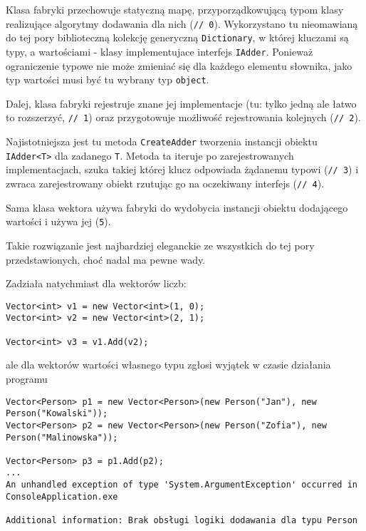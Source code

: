 Klasa fabryki przechowuje statyczną mapę, przyporządkowującą typom klasy realizujące algorytmy dodawania
dla nich ({\tt // 0}). Wykorzystano tu nieomawianą do tej pory biblioteczną kolekcję generyczną {\tt Dictionary},
w której kluczami są typy, a wartościami - klasy implementujace interfejs {\tt IAdder}. Ponieważ ograniczenie typowe
nie może zmieniać się dla każdego elementu słownika, jako typ wartości musi być tu wybrany typ {\tt object}.

Dalej, klasa fabryki rejestruje znane jej implementacje (tu: tylko jedną ale łatwo to rozszerzyć, {\tt // 1}) oraz
przygotowuje możliwość rejestrowania kolejnych ({\tt // 2}). 

Najistotniejsza jest tu metoda {\tt CreateAdder} tworzenia instancji obiektu {\tt IAdder<T>} dla zadanego {\tt T}.
Metoda ta iteruje po zarejestrowanych implementacjach, szuka takiej której klucz odpowiada żądanemu typowi ({\tt // 3}) i 
zwraca zarejestrowany obiekt rzutując go na oczekiwany interfejs ({\tt // 4}).

Sama klasa wektora używa fabryki do wydobycia instancji obiektu dodającego wartości i używa jej ({\tt 5}).

Takie rozwiązanie jest najbardziej eleganckie ze wszystkich do tej pory przedstawionych, choć nadal ma pewne wady.

Zadziała natychmiast dla wektorów liczb:

\begin{scriptsize}
\begin{verbatim}
Vector<int> v1 = new Vector<int>(1, 0);
Vector<int> v2 = new Vector<int>(2, 1);

Vector<int> v3 = v1.Add(v2);
\end{verbatim}
\end{scriptsize}

ale dla wektorów wartości własnego typu zgłosi wyjątek w czasie działania programu

\begin{scriptsize}
\begin{verbatim}
Vector<Person> p1 = new Vector<Person>(new Person("Jan"), new Person("Kowalski"));
Vector<Person> p2 = new Vector<Person>(new Person("Zofia"), new Person("Malinowska"));

Vector<Person> p3 = p1.Add(p2);
...
An unhandled exception of type 'System.ArgumentException' occurred in ConsoleApplication.exe

Additional information: Brak obsługi logiki dodawania dla typu Person
\end{verbatim}
\end{scriptsize}

